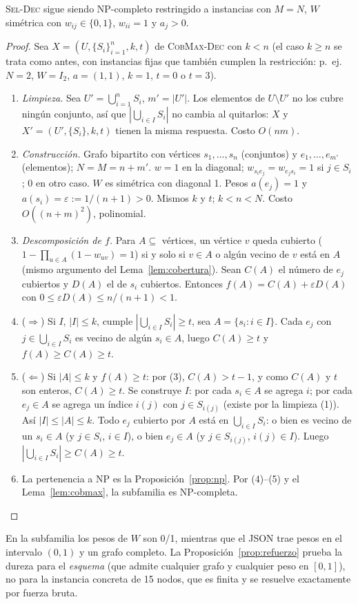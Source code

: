\begin{proposicion}\label{prop:refuerzo}
\textsc{Sel-Dec} sigue siendo NP-completo restringido a instancias con $M=N$, $W$ simétrica con $w_{ij}\in\{0,1\}$, $w_{ii}=1$ y $a_j>0$.
\end{proposicion}
\begin{proof}
Sea $X=(U,\{S_i\}_{i=1}^n,k,t)$ de \textsc{CobMax-Dec} con $k<n$ (el caso $k\ge n$ se trata como antes, con instancias fijas que también cumplen la restricción: p.\ ej.\ $N=2$, $W=I_2$, $a=(1,1)$, $k=1$, $t=0$ o $t=3$).
\begin{enumerate}[label=(\arabic*)]
\item \emph{Limpieza.} Sea $U'=\bigcup_{i=1}^nS_i$, $m'=|U'|$. Los elementos de $U\setminus U'$ no los cubre ningún conjunto, así que $|\bigcup_{i\in I}S_i|$ no cambia al quitarlos: $X$ y $X'=(U',\{S_i\},k,t)$ tienen la misma respuesta. Costo $O(nm)$.
\item \emph{Construcción.} Grafo bipartito con vértices $s_1,\dots,s_n$ (conjuntos) y $e_1,\dots,e_{m'}$ (elementos); $N=M=n+m'$. $w=1$ en la diagonal; $w_{s_i e_j}=w_{e_j s_i}=1$ si $j\in S_i$; $0$ en otro caso. $W$ es simétrica con diagonal 1. Pesos $a(e_j)=1$ y $a(s_i)=\varepsilon:=1/(n+1)>0$. Mismos $k$ y $t$; $k<n<N$. Costo $O((n+m)^2)$, polinomial.
\item \emph{Descomposición de $f$.} Para $A\subseteq$ vértices, un vértice $v$ queda cubierto ($1-\prod_{u\in A}(1-w_{uv})=1$) si y solo si $v\in A$ o algún vecino de $v$ está en $A$ (mismo argumento del Lema~\ref{lem:cobertura}). Sean $C(A)$ el número de $e_j$ cubiertos y $D(A)$ el de $s_i$ cubiertos. Entonces $f(A)=C(A)+\varepsilon D(A)$ con $0\le\varepsilon D(A)\le n/(n+1)<1$.
\item ($\Rightarrow$) Si $I$, $|I|\le k$, cumple $|\bigcup_{i\in I}S_i|\ge t$, sea $A=\{s_i:i\in I\}$. Cada $e_j$ con $j\in\bigcup_{i\in I}S_i$ es vecino de algún $s_i\in A$, luego $C(A)\ge t$ y $f(A)\ge C(A)\ge t$.
\item ($\Leftarrow$) Si $|A|\le k$ y $f(A)\ge t$: por (3), $C(A)> t-1$, y como $C(A)$ y $t$ son enteros, $C(A)\ge t$. Se construye $I$: por cada $s_i\in A$ se agrega $i$; por cada $e_j\in A$ se agrega un índice $i(j)$ con $j\in S_{i(j)}$ (existe por la limpieza (1)). Así $|I|\le|A|\le k$. Todo $e_j$ cubierto por $A$ está en $\bigcup_{i\in I}S_i$: o bien es vecino de un $s_i\in A$ (y $j\in S_i$, $i\in I$), o bien $e_j\in A$ (y $j\in S_{i(j)}$, $i(j)\in I$). Luego $|\bigcup_{i\in I}S_i|\ge C(A)\ge t$.
\item La pertenencia a NP es la Proposición~\ref{prop:np}. Por (4)–(5) y el Lema~\ref{lem:cobmax}, la subfamilia es NP-completa.
\end{enumerate}
\end{proof}
\begin{observacion}
En la subfamilia los pesos de $W$ son 0/1, mientras que el JSON trae pesos en el intervalo $(0,1)$ y un grafo completo. La Proposición~\ref{prop:refuerzo} prueba la dureza para el \emph{esquema} (que admite cualquier grafo y cualquier peso en $[0,1]$), no para la instancia concreta de 15 nodos, que es finita y se resuelve exactamente por fuerza bruta.
\end{observacion}

